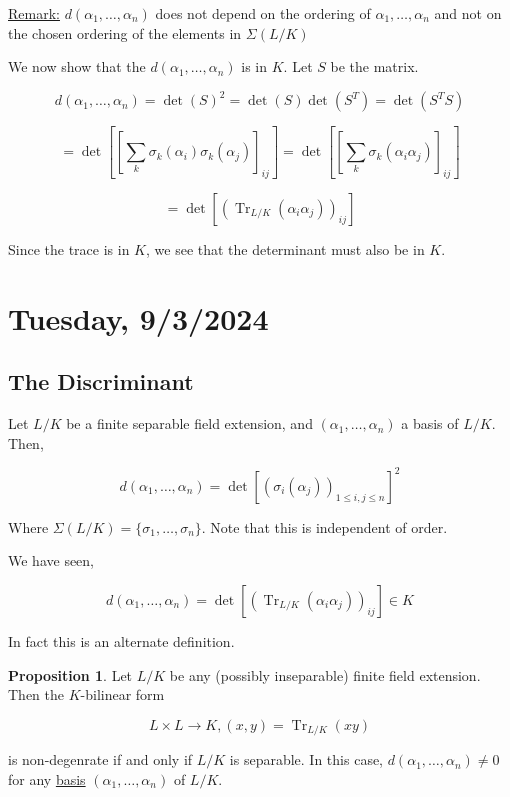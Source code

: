 \documentclass[openany]{amsbook}
\numberwithin{section}{chapter}
\theoremstyle{definition}
\newtheorem{proposition}[theorem]{Proposition}
\newcommand{\Tr}{\operatorname{Tr}}
\begin{document}
\underline{Remark:} \(d(\alpha_1, \dots , \alpha_n)\) does not depend on the ordering of \(\alpha_1, \dots , \alpha_n\) and not on the chosen ordering of the elements in \(\Sigma(L / K)\) 

We now show that the \(d(\alpha_1, \dots , \alpha_n)\) is in \(K\). Let \(S\) be the matrix.

\[d(\alpha_1, \dots , \alpha_n) = \det(S)^2 = \det(S)\det(S^T) = \det (S^T S)\]

\[
    =\det \left[ \left[ \sum_{k} \sigma_k(\alpha_i)\sigma_k(\alpha_j) \right]_{ij}\right] = \det \left[ \left[ \sum_{k} \sigma_k(\alpha_i\alpha_j) \right]_{ij}\right]
\]
 
\[
    = \det \left[ (\Tr_{L / K} (\alpha_i \alpha_j) )_{ij} \right] 
\]

Since the trace is in \(K\), we see that the determinant must also be in \(K\).

\section*{Tuesday, 9/3/2024}

\subsection*{The Discriminant}

Let \(L / K\) be a finite separable field extension, and \((\alpha_1, \dots , \alpha_n)\) a basis of \(L / K\). Then,

\[
    d(\alpha_1, \dots , \alpha_n) = \det[(\sigma_i(\alpha_j))_{1 \le i,j \le n}]^2
\]

Where \(\Sigma(L / K) = \{ \sigma_1, \dots , \sigma_n \}\). Note that this is independent of order.

We have seen,

\[
    d(\alpha_1, \dots , \alpha_n) = \det \left[ (\Tr_{L / K}(\alpha_i \alpha_j))_{i j} \right] \in K
\]

In fact this is an alternate definition.

\begin{proposition}

    Let \(L / K\) be any (possibly inseparable) finite field extension. Then the \(K\)-bilinear form

    \[
        L \times L \to K, (x,y) = \Tr_{L / K}(xy)
    \]

is non-degenrate if and only if \(L / K\) is separable. In this case, \(d(\alpha_1, \dots , \alpha_n) \neq 0\) for any \underline{basis} \((\alpha_1, \dots , \alpha _n)\) of \(L / K\).

\end{proposition}
\end{document}
